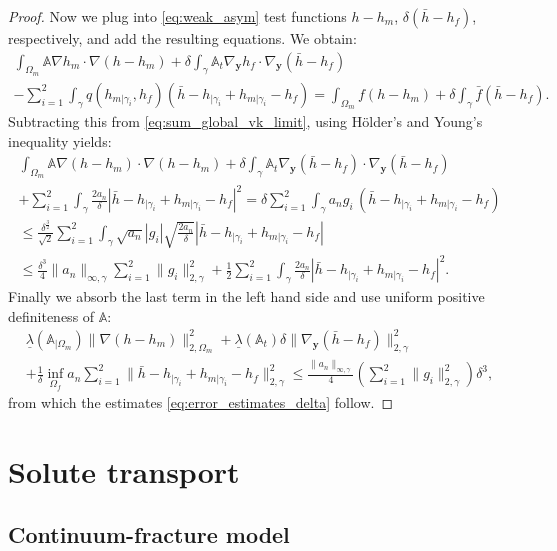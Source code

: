 \documentclass[a4paper]{article}
\def\vc#1{\mathbf{\boldsymbol{#1}}}     %
\def\tn#1{{\mathbb{#1}}}    %
\def\norm#1{\|#1\|}
\def\yy{{\vc y}}
\begin{document}
\begin{proof}
Now we plug into \eqref{eq:weak_asym} test functions $h-h_m$, $\delta(\bar h-h_f)$, respectively, and add the resulting equations.
We obtain:
\begin{multline*}
\int_{\Omega_m}\tn A\nabla h_m\cdot\nabla(h-h_m) + \delta\int_\gamma\tn A_t\nabla_\yy h_f\cdot\nabla_\yy(\bar h-h_f)\\
- \sum_{i=1}^2\int_\gamma q(h_{m|\gamma_i},h_f)(\bar h - h_{|\gamma_i}+h_{m|\gamma_i} - h_f)
= \int_{\Omega_m} f(h-h_m)
+ \delta\int_\gamma\bar f(\bar h-h_f).
\end{multline*}
Subtracting this from \eqref{eq:sum_global_vk_limit}, using H\"older's and Young's inequality yields:
\begin{multline}
\int_{\Omega_m}\tn A\nabla (h-h_m)\cdot\nabla(h-h_m)
+\delta\int_\gamma\tn A_t\nabla_\yy(\bar h-h_f)\cdot\nabla_\yy(\bar h-h_f)\\
+ \sum_{i=1}^2\int_\gamma \frac{2a_n}\delta |\bar h - h_{|\gamma_i} + h_{m|\gamma_i} - h_f|^2
= \delta\sum_{i=1}^2\int_\gamma a_n g_i\, (\bar h - h_{|\gamma_i} + h_{m|\gamma_i} - h_f)\\
\le \frac{\delta^{\frac32}}{\sqrt2}\sum_{i=1}^2\int_\gamma \sqrt{a_n}|g_i|\sqrt{\frac{2a_n}\delta}|\bar h - h_{|\gamma_i} + h_{m|\gamma_i} - h_f|\\
\le \frac{\delta^3}4\norm{a_n}_{\infty,\gamma}\sum_{i=1}^2\norm{g_i}_{2,\gamma}^2 + \frac12\sum_{i=1}^2\int_\gamma \frac{2a_n}\delta |\bar h - h_{|\gamma_i} + h_{m|\gamma_i} - h_f|^2.
\end{multline}
Finally we absorb the last term in the left hand side and use uniform positive definiteness of $\tn A$:
\begin{multline}
\underline\lambda(\tn A_{|\Omega_m})\norm{\nabla (h-h_m)}_{2,\Omega_m}^2
+\underline\lambda(\tn A_t)\delta\norm{\nabla_\yy(\bar h-h_f)}_{2,\gamma}^2\\
+ \frac1\delta\inf_{\Omega_f}a_n\sum_{i=1}^2\norm{\bar h - h_{|\gamma_i} + h_{m|\gamma_i} - h_f}_{2,\gamma}^2
\le \frac{\norm{a_n}_{\infty,\gamma}}4\left(\sum_{i=1}^2\norm{g_i}_{2,\gamma}^2\right)\delta^3,
\end{multline}
from which the estimates \eqref{eq:error_estimates_delta} follow.
\end{proof}

\section{Solute transport}
\subsection{Continuum-fracture model}
\end{document}

